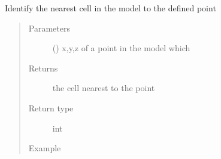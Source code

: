 \documentclass[letterpaper,10pt,english]{sphinxmanual}
\begin{document}
\begin{fulllineitems}
\begin{fulllineitems}
\begin{quote}
\begin{description}
\end{description}\end{quote}

\end{fulllineitems}


\begin{fulllineitems}
\label{\detokenize{openfdem:openfdem.openfdem.Model.extract_cell_info}}
\end{fulllineitems}


\begin{fulllineitems}
\label{\detokenize{openfdem:openfdem.openfdem.Model.find_cell}}
Identify the nearest cell in the model to the defined point
\begin{quote}\begin{description}
\item[{Parameters}] \leavevmode
{} (\sphinxstyleliteralemphasis{\sphinxupquote{{[}}}\sphinxstyleliteralemphasis{\sphinxupquote{, }}\sphinxstyleliteralemphasis{\sphinxupquote{, }}\sphinxstyleliteralemphasis{\sphinxupquote{{]}}}) \textendash{} x,y,z of a point in the model which

\item[{Returns}] \leavevmode
the cell nearest to the point

\item[{Return type}] \leavevmode
int

\item[{Example}] \leavevmode
\begin{sphinxVerbatim}[commandchars=\\\{\}]
   
  


\end{sphinxVerbatim}
\end{description}
\end{quote}
\end{fulllineitems}
\end{fulllineitems}
\end{document}
